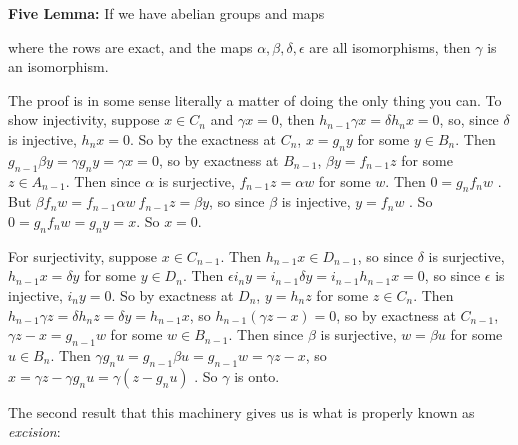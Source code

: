 \msk

{\bf Five Lemma:} If we have abelian groups and maps

\ssk


\ssk

where the rows are exact, and the maps $\alpha,\beta,\delta,\epsilon$ are all isomorphisms, then $\gamma$ is an isomorphism.

\msk

The proof is in some sense literally a matter of doing the only thing you can. To show injectivity, suppose
$x\in C_n$ and $\gamma x = 0$, 
then $h_{n-1}\gamma x = \delta h_n x = 0$, so, 
since $\delta$ is injective,
$h_n x = 0$. So 
by the exactness at $C_n$, $x=g_n y$ for some $y\in B_n$. 
Then $g_{n-1} \beta y = \gamma g_n y = \gamma x = 0$, so 
by exactness at $B_{n-1}$, $\beta y = f_{n-1} z$ for some $z\in A_{n-1}$. Then 
since $\alpha$ is surjective,
$f_{n-1}z = \alpha w$ for some $w$. Then 
$0=g_n f_n w$ . But 
$\beta f_n w = f_{n-1} \alpha w \ f_{n-1} z = \beta y$, so since
$\beta$ is injective, 
$y= f_n w$ . So $0=g_n f_n w = g_n y = x$. So $x=0$.

\ssk

For surjectivity, suppose $x\in C_{n-1}$.
Then $h_{n-1} x \in D_{n-1}$, so
since $\delta$ is surjective, 
$h_{n-1} x = \delta y$ for some $y\in D_n$.
Then $\epsilon i_n y = i_{n-1}\delta y = i_{n-1} h_{n-1} x = 0$, so 
since $\epsilon$ is injective, $i_n y= 0$.
So by exactness at $D_n$, 
$y=h_n z$ for some $z\in C_n$. Then 
$h_{n-1}\gamma z = \delta h_n z = \delta y = h_{n-1} x$,
so $h_{n-1} (\gamma z-x) = 0$, so 
by exactness at $C_{n-1}$, 
$\gamma z-x = g_{n-1}w$ for some $w\in B_{n-1}$. Then
since $\beta$ is surjective, 
$w= \beta u$ for some $u\in B_n$. Then 
$\gamma g_n u = g_{n-1} \beta u = g_{n-1}w = \gamma z-x$,
so $x=\gamma z - \gamma g_n u = \gamma (z-g_n u)$ . 
So $\gamma$ is onto.

\bsk

The second result that this machinery gives us is what is properly known as {\it excision}:

